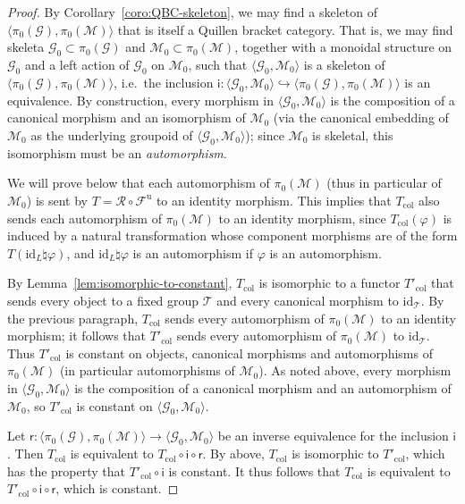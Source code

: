 \documentclass[AHL,Unicode,published]{cedram}
\newcommand{\id}{\mathrm{id}}
\newcommand{\col}{\mathrm{col}}
\newcommand{\unt}{\mathrm{u}}
\newcommand{\sR}{\mathscr{R}}
\newcommand{\sI}{\mathsf{i}}
\newcommand{\sr}{\mathsf{r}}
\newcommand{\cF}{\mathcal{F}}
\newcommand{\cG}{\mathcal{G}}
\newcommand{\cM}{\mathcal{M}}
\newcommand{\cT}{\mathcal{T}}
\begin{document}
\begin{proof}
By Corollary~\ref{coro:QBC-skeleton}, we may find a skeleton of $\langle \pi_{0}(\cG), \pi_{0}(\cM) \rangle$ that is itself a Quillen bracket category. That is, we may find skeleta $\cG_{0} \subset \pi_{0}(\cG)$ and $\cM_{0} \subset \pi_{0}(\cM)$, together with a monoidal structure on $\cG_{0}$ and a left action of $\cG_{0}$ on $\cM_{0}$, such that $\langle \cG_{0}, \cM_{0} \rangle$ is a skeleton of $\langle \pi_{0}(\cG), \pi_{0}(\cM) \rangle$, i.e.~the inclusion $\sI \colon \langle \cG_{0}, \cM_{0} \rangle \hookrightarrow \langle \pi_{0}(\cG), \pi_{0}(\cM) \rangle$ is an equivalence. By construction, every morphism in $\langle \cG_{0}, \cM_{0} \rangle$ is the composition of a canonical morphism and an isomorphism of $\cM_{0}$ (via the canonical embedding of $\cM_{0}$ as the underlying groupoid of $\langle \cG_{0}, \cM_{0} \rangle$); since $\cM_{0}$ is skeletal, this isomorphism must be an \emph{automorphism}.

We will prove below that each automorphism of $\pi_{0}(\cM)$ (thus in particular of $\cM_{0}$) is sent by $T = \sR \circ \cF^{\unt}$ to an identity morphism. This implies that $T_{\col}$ also sends each automorphism of $\pi_{0}(\cM)$ to an identity morphism, since $T_{\col}(\varphi)$ is induced by a natural transformation whose component morphisms are of the form $T(\id_L \natural \varphi)$, and $\id_L \natural \varphi$ is an automorphism if $\varphi$ is an automorphism.

By Lemma~\ref{lem:isomorphic-to-constant}, $T_{\col}$ is isomorphic to a functor $T'_{\col}$ that sends every object to a fixed group $\cT$ and every canonical morphism to $\id_\cT$. By the previous paragraph, $T_{\col}$ sends every automorphism of $\pi_{0}(\cM)$ to an identity morphism; it follows that $T'_{\col}$ sends every automorphism of $\pi_{0}(\cM)$ to $\id_\cT$. Thus $T'_{\col}$ is constant on objects, canonical morphisms and automorphisms of $\pi_{0}(\cM)$ (in particular automorphisms of $\cM_{0}$). As noted above, every morphism in $\langle \cG_{0}, \cM_{0} \rangle$ is the composition of a canonical morphism and an automorphism of $\cM_{0}$, so $T'_{\col}$ is constant on $\langle \cG_{0}, \cM_{0} \rangle$.

Let $\sr \colon \langle \pi_{0}(\cG), \pi_{0}(\cM) \rangle \to \langle \cG_{0}, \cM_{0} \rangle$ be an inverse equivalence for the inclusion $\sI$. Then $T_{\col}$ is equivalent to $T_{\col} \circ \sI \circ \sr$. By above, $T_{\col}$ is isomorphic to $T'_{\col}$, which has the property that $T'_{\col} \circ \sI$ is constant. It thus follows that $T_{\col}$ is equivalent to $T'_{\col} \circ \sI \circ \sr$, which is constant.


\end{proof}
\end{document}
